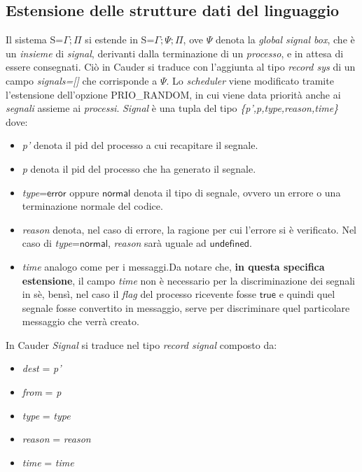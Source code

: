 \documentclass[Contributo.tex]{subfiles}
\begin{document}
\subsection{Estensione delle strutture dati del linguaggio}
Il sistema S=$\displaystyle \Gamma;\Pi$ si estende in S=$\displaystyle \Gamma;\Psi;\Pi$, ove $\Psi$ denota la \textit{global signal box}, che è un \textit{insieme} di \textit{signal}, derivanti dalla terminazione di un \textit{processo}, e in attesa di essere consegnati.
Ciò in Cauder si traduce con l'aggiunta al tipo \textit{record sys} di un campo \textit{signals=[]} che corrisponde a $\Psi$.
Lo \textit{scheduler} viene modificato tramite l'estensione dell'opzione PRIO\_RANDOM, in cui viene data priorità anche ai \textit{segnali} assieme ai \textit{processi}.
\textit{Signal} è una tupla del tipo \textit{\{p',p,type,reason,time\}} dove:
	\begin{itemize}
		\item \textit{p'} denota il pid del processo a cui recapitare il segnale.
		\item \textit{p} denota il pid del processo che ha generato il segnale.
		\item \textit{type}=$\mathsf{error}$ oppure $\mathsf{normal}$ denota il tipo di segnale, ovvero un errore o una terminazione normale del codice.
		\item \textit{reason} denota, nel caso di errore, la ragione per cui l'errore si è verificato.
			  Nel caso di \textit{type}=$\mathsf{normal}$, \textit{reason} sarà uguale ad $\mathsf{undefined}$.
		\item \textit{time} analogo come per i messaggi.Da notare che, \textbf{in questa specifica estensione}, il campo \textit{time} non è necessario per la discriminazione dei segnali in sè, bensì, nel caso il \textit{flag} del processo ricevente fosse $\mathsf{true}$ e quindi quel segnale fosse convertito in messaggio, serve per discriminare quel particolare messaggio che verrà creato.
	\end{itemize}
In Cauder \textit{Signal} si traduce nel tipo \textit{record signal} composto da:
	\begin{itemize}
		\item \textit{dest} = \textit{p'} 
		\item \textit{from} = \textit{p}
		\item \textit{type} = \textit{type}
		\item \textit{reason} = \textit{reason}
		\item \textit{time} = \textit{time}
	\end{itemize}
\end{document}
